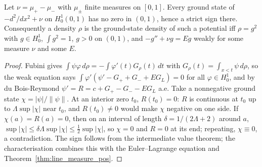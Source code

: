 \begin{theorem}[Measure potentials: no interior zeros, and the $N=1$ characterisation]
  \label{thm:line_measure_ucp}
  \leanok
  Let $\nu=\mu_+-\mu_-$ with $\mu_\pm$ finite measures on $[0,1]$. Every ground state of $-d^2/dx^2+\nu$ on $H^1_0(0,1)$ has no zero
  in $(0,1)$, hence a strict sign there. Consequently a density $\rho$ is the ground-state density of such a potential iff
  $\rho=g^2$ with $g\in H^1_0$, $\int g^2=1$, $g>0$ on $(0,1)$, and $-g''+\nu g=Eg$ weakly for some measure $\nu$ and some $E$.
\end{theorem}
\begin{proof}
  \leanok
  Fubini gives $\int\psi\varphi\,d\rho=-\int\varphi'(t)G_\rho(t)\,dt$ with $G_\rho(t)=\int_{x<t}\psi\,d\rho$, so the weak equation says
  $\int\varphi'(\psi'-G_++G_-+EG_L)=0$ for all $\varphi\in H^1_0$, and by du Bois-Reymond $\psi'=R=c+G_+-G_--EG_L$ a.e.
  Take a nonnegative ground state $\chi=|\psi|/\|\psi\|$. At an interior zero $t_0$, $R(t_0)=0$: $R$ is continuous at $t_0$ up to
  $\Lambda\sup|\chi|$ near $t_0$, and $R(t_0)\ne0$ would make $\chi$ negative on one side. If $\chi(a)=R(a)=0$, then on an interval of
  length $\delta=1/(2\Lambda+2)$ around $a$, $\sup|\chi|\le\delta\Lambda\sup|\chi|\le\frac12\sup|\chi|$, so $\chi=0$ and $R=0$ at its
  end; repeating, $\chi\equiv0$, a contradiction. The sign follows from the intermediate value theorem; the characterisation
  combines this with the Euler--Lagrange equation and Theorem~\ref{thm:line_measure_pos}.
\end{proof}

